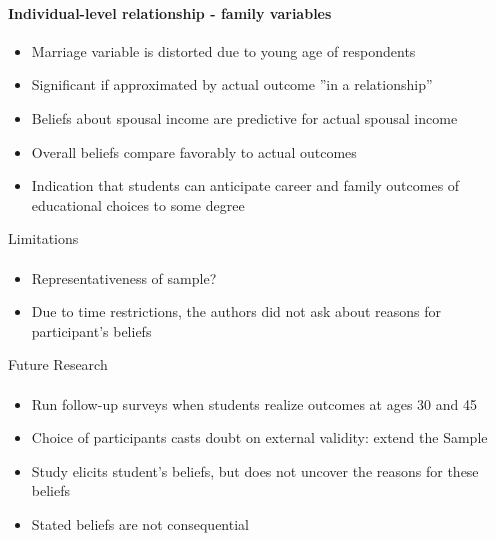 \documentclass[12pt]{beamer}
\begin{document}
\begin{frame}
    \framesubtitle{Individual-level relationship - family variables}
    \begin{itemize}
        \item Marriage variable is distorted due to young age of respondents
        \item Significant if approximated by actual outcome ”in a relationship”
        \item Beliefs about spousal income are predictive for actual spousal income
        \vspace{0.5cm}
        \item Overall beliefs compare favorably to actual outcomes
        \item Indication that students can anticipate career and family outcomes of educational choices to some degree
    \end{itemize}
\end{frame}

\begin{frame}{Limitations}
    \framesubtitle{} 
    \begin{itemize}
        \item Representativeness of sample?
        \item Due to time restrictions, the authors did not ask about reasons for participant's beliefs
    \end{itemize}
\end{frame}

\begin{frame}{Future Research}
    \framesubtitle{} 
    \begin{itemize}
        \item Run follow-up surveys when students realize outcomes at ages 30 and 45
        \item Choice of participants casts doubt on external validity: extend the Sample
        \item Study elicits student's beliefs, but does not uncover the reasons for these beliefs
        \item Stated beliefs are not consequential
    \end{itemize}
\end{frame}
\end{document}
